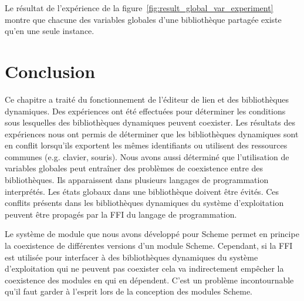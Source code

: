 Le résultat de l'expérience de la figure~\ref{fig:result_global_var_experiment} montre
que chacune des variables globales d'une bibliothèque partagée existe qu'en une seule
instance.





\section{Conclusion}
%
Ce chapitre a traité du fonctionnement de l'éditeur de lien et des
bibliothèques dynamiques. Des expériences ont été effectuées pour déterminer
les conditions sous lesquelles des bibliothèques dynamiques peuvent
coexister. Les résultats des expériences nous ont permis de déterminer
que les bibliothèques dynamiques sont en conflit lorsqu'ils exportent
les mêmes identifiants ou utilisent des ressources communes (e.g. clavier,
souris).
Nous avons aussi déterminé que l'utilisation de variables globales peut entraîner
des problèmes de coexistence entre des bibliothèques. Ils apparaissent dans
plusieurs langages de programmation interprétés. Les états globaux dans
une bibliothèque doivent être évités.
Ces conflits présents dans les bibliothèques dynamiques
du système d'exploitation peuvent être propagés par la FFI du langage
de programmation.

Le système de module que nous avons développé pour Scheme permet en principe la
coexistence de différentes versions d'un module Scheme. Cependant, si la FFI est utilisée
pour interfacer à des bibliothèques dynamiques du système d'exploitation qui
ne peuvent pas coexister cela va indirectement empêcher la coexistence des modules en
qui en dépendent. C'est un problème incontournable qu'il faut garder à l'esprit
lors de la conception des modules Scheme.


